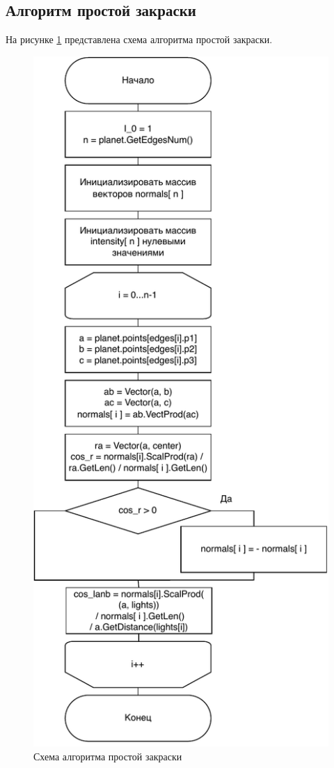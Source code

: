     \subsection{Алгоритм простой закраски}
    \par На рисунке \ref{schema:P_zak} представлена схема алгоритма простой закраски.
    \begin{figure}[h!]
            \centering
            \includegraphics[scale=0.8]{inc/P_zak.pdf}
            \caption{Схема алгоритма простой закраски}
            \label{schema:P_zak}
    \end{figure}\clearpage
